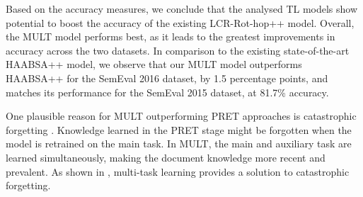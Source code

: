 Based on the accuracy measures, we conclude that the analysed TL models show potential to boost the accuracy of the existing LCR-Rot-hop++ model. Overall, the MULT model performs best, as it leads to the greatest improvements in accuracy across the two datasets. In comparison to the existing state-of-the-art HAABSA++ model, we observe that our MULT model outperforms HAABSA++ for the SemEval 2016 dataset, by 1.5 percentage points, and matches its performance for the SemEval 2015 dataset, at 81.7\% accuracy. 

One plausible reason for MULT outperforming PRET approaches is catastrophic forgetting \cite{Chen2020}. Knowledge learned in the PRET stage might be forgotten when the model is retrained on the main task. In MULT, the main and auxiliary task are learned simultaneously, making the document knowledge more recent and prevalent. As shown in \cite{Chen2020}, multi-task learning provides a solution to catastrophic forgetting.


